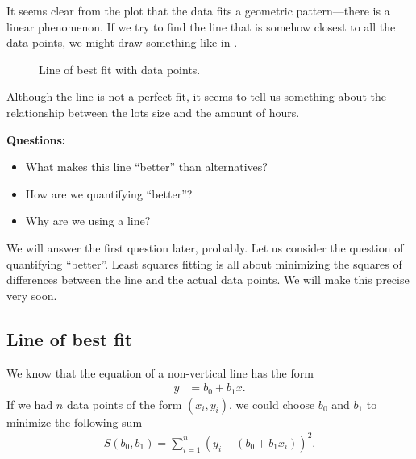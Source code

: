\documentclass[a4paper, 12pt]{article}
\numberwithin{equation}{section}
\numberwithin{figure}{section}
\theoremstyle{definition}
\begin{document}
It seems clear from the plot that the data fits a geometric pattern---there is a
linear phenomenon. If we try to find the line that is somehow closest to all the
data points, we might draw something like in . 

\begin{figure}[h] 
	\centering
	\caption{Line of best fit with data points.}
	\label{fig:2d-linear-data-line}
\end{figure}

Although the line is not a perfect fit, it seems to tell us something about the
relationship between the lots size and the amount of hours. 

\textbf{Questions:}
\begin{itemize}
	\item What makes this line ``better'' than alternatives?
	\item How are we quantifying ``better''? 
	\item Why are we using a line? 
\end{itemize}
We will answer the first question later, probably. Let us consider the question
of quantifying ``better''. Least squares fitting is all about minimizing the
squares of differences between the line and the actual data points. We will make
this precise very soon.

\subsection{Line of best fit}

We know that the equation of a non-vertical line has the form 
\begin{align*}
	y &= b_0 + b_1x.
\end{align*}
If we had $n$ data points of the form $(x_i,y_i)$, we could choose $b_0$ and
$b_1$ to minimize the following sum
\begin{align*}
	S(b_0,b_1) = \sum_{i=1}^n \left(y_i - (b_0 + b_1x_i)\right)^2 .
\end{align*}
\end{document}
